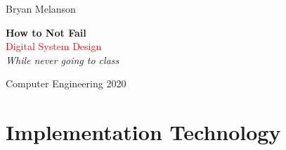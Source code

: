 \documentclass[11pt]{article}
\newcommand*{\plogo}{\fbox{$\mathcal{BM}$}}
\begin{document}
 
        
    \begin{titlepage}
    
        \raggedleft
        
        \vspace*{\baselineskip}
        
        {\Large Bryan Melanson}
        
        \vspace*{0.167\textheight}
        
        \textbf{\LARGE How to Not Fail}\\[\baselineskip]
        
        {\textcolor{Red}{\Huge Digital System Design}}\\[\baselineskip]
        
        {\Large \textit{While never going to class}}
        
        \vfill
        
        {\large Computer Engineering 2020 ~~\plogo}
        
        \vspace*{3\baselineskip}
    
    \end{titlepage}

    \pagebreak
    

    \tableofcontents

    \pagebreak
    \section{Implementation Technology}
\end{document}
